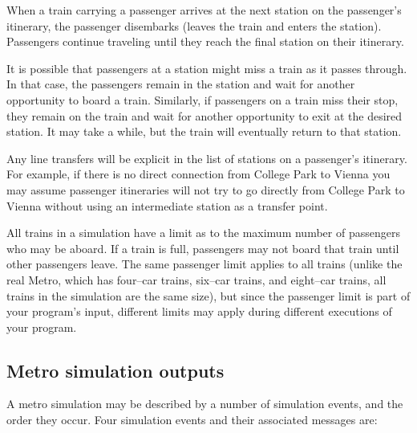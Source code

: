 \documentclass[11pt]{article}
\begin{document}
        When a train carrying a passenger arrives at the next station on the
      passenger's itinerary, the passenger disembarks (leaves the train and
      enters the station).  Passengers continue traveling until they reach
      the final station on their itinerary.

        It is possible that passengers at a station might miss a train as it
      passes through.  In that case, the passengers remain in the station
      and wait for another opportunity to board a train.  Similarly, if
      passengers on a train miss their stop, they remain on the train and
      wait for another opportunity to exit at the desired station.  It may
      take a while, but the train will eventually return to that station.

        Any line transfers will be explicit in the list of stations on a
      passenger's itinerary.  For example, if there is no direct connection
      from College Park to Vienna you may assume passenger itineraries will
      not try to go directly from College Park to Vienna without using an
      intermediate station as a transfer point.

        All trains in a simulation have a limit as to the maximum number of
      passengers who may be aboard.  If a train is full, passengers may not
      board that train until other passengers leave.  The same passenger
      limit applies to all trains (unlike the real Metro, which has
      four--car trains, six--car trains, and eight--car trains, all trains
      in the simulation are the same size), but since the passenger limit is
      part of your program's input, different limits may apply during
      different executions of your program.

    \subsection{Metro simulation outputs\label{section:outputs}}

      A metro simulation may be described by a number of simulation events,
    and the order they occur.  Four simulation events and their associated
    messages are:

      \vspace{-3.5mm}
\end{document}
